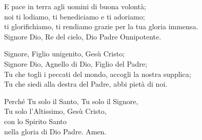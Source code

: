 

\spazio

\strofa E pace in terra agli uomini di buona volontà;\\
noi ti lodiamo, ti benediciamo e ti adoriamo;\\
ti glorifichiamo, ti rendiamo grazie per la tua gloria immensa.\\
Signore Dio, Re del cielo, Dio Padre Onnipotente.

\spazio


\spazio

\strofa Signore, Figlio unigenito, Gesù Cristo;\\
Signore Dio, Agnello di Dio, Figlio del Padre;\\
Tu che togli i peccati del mondo, accogli la nostra supplica;\\
Tu che siedi alla destra del Padre, abbi pietà di noi.

\spazio


\spazio

\strofa Perché Tu solo il Santo, Tu solo il Signore,\\
Tu solo l'Altissimo, Gesù Cristo,\\
con lo Spirito Santo\\
nella gloria di Dio Padre. Amen.

\spazio


